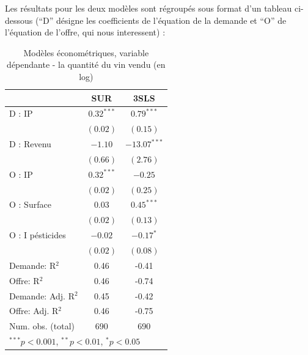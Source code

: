 \documentclass[11pt,]{article}
\begin{document}
Les résultats pour les deux modèles sont régroupés sous format d'un
tableau ci-dessous (``D'' désigne les coefficients de l'équation de la
demande et ``O'' de l'équation de l'offre, qui nous interessent) :

\FloatBarrier

\begin{table}[!htbp]
\begin{center}
\begin{tabular}{l c c }
\hline
 & SUR & 3SLS \\
\hline
D : IP              & $0.32^{***}$ & $0.79^{***}$   \\
                    & $(0.02)$     & $(0.15)$       \\
D : Revenu          & $-1.10$      & $-13.07^{***}$ \\
                    & $(0.66)$     & $(2.76)$       \\
O : IP              & $0.32^{***}$ & $-0.25$        \\
                    & $(0.02)$     & $(0.25)$       \\
O : Surface         & $0.03$       & $0.45^{***}$   \\
                    & $(0.02)$     & $(0.13)$       \\
O : I pésticides    & $-0.02$      & $-0.17^{*}$    \\
                    & $(0.02)$     & $(0.08)$       \\
\hline
Demande: R$^2$      & 0.46         & -0.41          \\
Offre: R$^2$        & 0.46         & -0.74          \\
Demande: Adj. R$^2$ & 0.45         & -0.42          \\
Offre: Adj. R$^2$   & 0.46         & -0.75          \\
Num. obs. (total)   & 690          & 690            \\
\hline
\multicolumn{3}{l}{\scriptsize{$^{***}p<0.001$, $^{**}p<0.01$, $^*p<0.05$}}
\end{tabular}
\caption{Modèles économétriques, variable dépendante - la quantité du vin vendu (en log)}
\label{table : sur et 3sls}
\end{center}
\end{table}

\FloatBarrier
\end{document}
